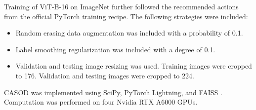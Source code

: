 Training of ViT-B-16 on ImageNet further followed the recommended actions from the official PyTorch training recipe. The following strategies were included:
\begin{itemize}
    \item Random erasing \cite{zhong2020random,devries2018learning} data augmentation was included with a probability of 0.1.
    \item Label smoothing \cite{szegedy2016rethinking} regularization was included with a degree of 0.1.
    \item Validation and testing image resizing \cite{touvron2019fixing} was used. Training images were cropped to 176. Validation and testing images were cropped to 224.
\end{itemize}

CASOD was implemented using SciPy, PyTorch Lightning, and FAISS \cite{johnson2019billion}. Computation was performed on four Nvidia RTX A6000 GPUs.

